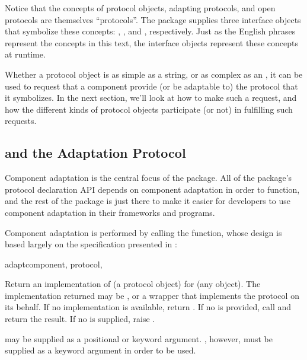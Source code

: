 Notice that the concepts of protocol objects, adapting protocols, and open
protocols are themselves ``protocols''.  The  package supplies
three interface objects that symbolize these concepts: ,
, and , respectively.  Just as
the English phrases represent the concepts in this text, the interface objects
represent these concepts at runtime.

Whether a protocol object is as simple as a string, or as complex as an
, it can be used to request that a component provide
(or be adaptable to) the protocol that it symbolizes.  In the next section,
we'll look at how to make such a request, and how the different kinds of
protocol objects participate (or not) in fulfilling such requests.






















\subsection{ and the Adaptation Protocol
\label{adapt-protocol}}

Component adaptation is the central focus of the  package.
All of the package's protocol declaration API depends on component adaptation
in order to function, and the rest of the package is just there to make it
easier for developers to use component adaptation in their frameworks and
programs.

Component adaptation is performed by calling the  function,
whose design is based largely on the specification presented in :

\begin{funcdesc}{adapt}{component, protocol,
}

Return an implementation of  (a protocol object) for
 (any object).  The implementation returned may be
, or a wrapper that implements the protocol on its
behalf.  If no implementation is available, return .  If no
 is provided, call  and return the result.  If no  is supplied,
raise .

 may be supplied as a positional or keyword argument.
, however, must be supplied as a keyword argument in order
to be used.
\end{funcdesc}

